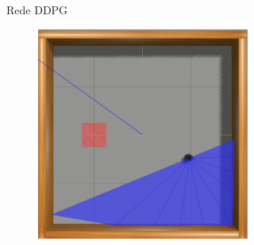 \begin{figure}[H]
\begin{center}
\begin{subfigure}[b]{0.60\textwidth}
\begin{subfigure}[b]{0.24\textwidth}
        \end{subfigure}
        \caption{Rede DDPG}
        \label{subfig:simulated_env1_ddpg}
    \end{subfigure}
      
    \begin{subfigure}[b]{0.60\textwidth}
        \begin{subfigure}[b]{0.24\textwidth}
            \includegraphics[width=\textwidth]{imagens/simulated_envs/sim_env1_sac/1.png}
        \end{subfigure}
        \hfill
        \begin{subfigure}[b]{0.24\textwidth}

\end{subfigure}
\end{subfigure}
\end{center}
\end{figure}
